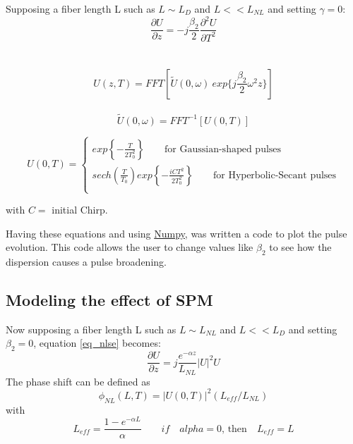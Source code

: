         Supposing a fiber length L such as $L \sim L_D$ and $L << L_{NL}$ and setting $\gamma = 0$: 
            \begin{equation}
                \frac{\partial U}{\partial z} = -j\frac{\beta_2}{2}\frac{\partial^2U}{\partial T^2}
            \end{equation}
            \ \\
            \ \\
            \begin{equation}
                U(z,T) = FFT \left[ \tilde{U}(0,\omega) \ exp\{j\frac{\beta_2}{2}\omega^2z\} \right]
            \end{equation}
            \ \\
            \begin{equation}
                \tilde{U}(0,\omega)  = FFT^{-1} \left[ U(0,T)\right]
            \end{equation}
        
        
        \begin{equation}
                U(0,T) = 
                \begin{cases}
                    exp \left\{ -\frac{T}{2T^2_0} \right\} \qquad \text{for Gaussian-shaped pulses}  \\
                    sech\left( \frac{T}{T_0}\right) exp \left\{ -\frac{iCT^2}{2T^2_0} \right\} \qquad \text{for Hyperbolic-Secant pulses}  \\
                \end{cases}
            \end{equation}
            \begin{center}
                with $C =$  initial Chirp.
            \end{center}
            Having these equations and using \href{https://numpy.org/}{Numpy}, was written a code to plot the pulse evolution. This code allows the user to change values like $\beta_2$ to see how the dispersion causes a pulse broadening.
        
        
        \subsection{Modeling the effect of SPM}
        
        Now supposing a fiber length L such as $L \sim L_{NL}$ and $L << L_D$ and setting $\beta_2 = 0$, equation \eqref{eq_nlse} becomes: 
            \begin{equation}
                \frac{\partial U}{\partial z} = j\frac{e^{-\alpha z}}{L_{NL}}|U|^2 U
            \end{equation}
            The phase shift can be defined as 
            \begin{equation}
                \phi_{NL}(L,T) = |U(0,T)|^2 (L_{eff}/L_{NL})
            \end{equation}
            with 
            \begin{equation}
                L_{eff} = \frac{1-e^{-\alpha L}}{\alpha}
                \qquad if \quad alpha = 0 \text{, then} \quad L_{eff} = L
            \end{equation}
            
